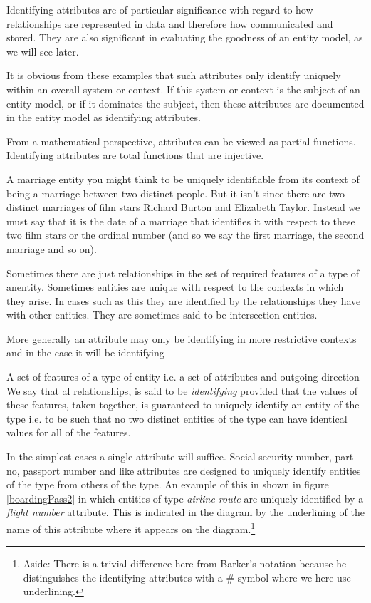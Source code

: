 \mynote Identifying attributes are of particular significance with regard to 
 how relationships are represented in data and therefore how communicated and stored.
They are also significant in evaluating the goodness of an entity model, as we will see later.

\mynote
It is obvious from these examples that such attributes only identify uniquely within an overall system or context. If this system or context is the subject of an entity model, or if it dominates the subject, then these attributes are documented in the entity model as identifying attributes. 

\mynote From a mathematical perspective, attributes can be viewed as partial functions. Identifying attributes are total functions that are injective.  

\mynote
A marriage entity you might think to be uniquely identifiable from its context of being a marriage between two distinct people. But it isn't since there are two distinct marriages of film stars Richard Burton and Elizabeth Taylor. Instead we must say that it is the date of a marriage that identifies it with respect to these two film stars or the ordinal number (and so we say the first marriage, the second marriage and so on).

\mynote Sometimes there are just relationships in the set of required features of a type of anentity. Sometimes entities are unique with respect to the contexts in which they arise. In cases such as this they are identified by the relationships they have with other entities. They are sometimes said to be intersection entities.



\mynote
More generally an attribute may only be identifying in more restrictive contexts and in the case it will be identifying 


\mynote A set of features of a type of entity i.e. a set of attributes and outgoing direction We say that al relationships, is said to be \textit{identifying} provided that the values of these features,
taken together, is guaranteed to uniquely identify an entity of the type i.e. to be such that no two distinct entities of the type can have identical values for all of the features. 

\mynote In the simplest cases a single attribute will suffice. Social security number, part no, 
passport number and like attributes are designed to uniquely identify entities of the type from others of the type. 
An example of this 
in  shown in figure \ref{boardingPass2} in which entities of type \textit{airline route} are uniquely identified by a \textit{flight number} attribute.
This is
indicated in the diagram  by the underlining of the name of this attribute where it appears on the diagram.\footnote{Aside: There is a trivial difference here from Barker's notation because he distinguishes the identifying attributes with a \# symbol where we here use  underlining.} 

